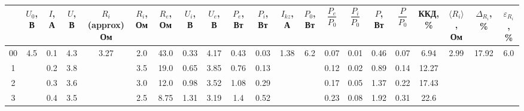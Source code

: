 \documentclass[a4paper,12pt]{article}
\begin{document}
\begin{table}[htp]
\begin{adjustwidth}{-2cm}{}
\begin{tabular}{|c|c|c|c|c|c|c|c|c|c|c|c|c|c|c|c|c|c|c|c|c|}
\hline
  & \makecell{$U_0$,\\  В} & \makecell{$I$, \\  А} & \makecell{$U$,\\  В} & \makecell{$R_i$ (approx)\\  Ом} & \makecell{$R_i$,\\  Ом} & \makecell{$R_e$,\\  Ом} & \makecell{$U_i$,\\  В} & \makecell{$U_e$,\\  В} & \makecell{$P_e$, \\  Вт} & \makecell{$P_i$, \\  Вт} & \makecell{$I_{kz}$,\\  А} &\makecell{ $P_0$, \\  Вт} & $\dfrac{P_e}{P_0}$ & $\dfrac{P_i}{P_0}$ & \makecell{$P$, \\  Вт} & $\dfrac{P}{P_0}$ & \makecell{ККД, \\  \%} & \makecell{$\langle R_i\rangle$, \\  Ом} & \makecell{$\Delta_{R_i}$, \\  \%} & \makecell{$\varepsilon_{R_i}$, \\  \%} \\ \hline00     & \multirow{8}{*}{4.5} & 0.1  & 4.3  & \multirow{8}{*}{3.27} & 2.0  & 43.0 & 0.33 & 4.17 & 0.43 & 0.03 & \multirow{8}{*}{1.38} & \multirow{8}{*}{6.2} & 0.07      & 0.01      & 0.46 & 0.07   & 6.94       & \multirow{8}{*}{2.99} & \multirow{8}{*}{17.92} & \multirow{8}{*}{6.0} \\ \cline{1-1} \cline{3-4} \cline{6-11} \cline{14-18}
1     &                      & 0.2  & 3.8  &                       & 3.5  & 19.0 & 0.65 & 3.85 & 0.76 & 0.13 &                       &                      & 0.12      & 0.02      & 0.89 & 0.14   & 12.27      &                       &                        &                      \\ \cline{1-1} \cline{3-4} \cline{6-11} \cline{14-18}
2     &                      & 0.3  & 3.6  &                       & 3.0  & 12.0 & 0.98 & 3.52 & 1.08 & 0.29 &                       &                      & 0.17      & 0.05      & 1.37 & 0.22   & 17.43      &                       &                        &                      \\ \cline{1-1} \cline{3-4} \cline{6-11} \cline{14-18}
3     &                      & 0.4  & 3.5  &                       & 2.5  & 8.75 & 1.31 & 3.19 & 1.4  & 0.52 &                       &                      & 0.23      & 0.08      & 1.92 & 0.31   & 22.6       &                       &                        &                      \\ \cline{1-1} \cline{3-4} \cline{6-11} \cline{14-18}

\end{tabular}
\end{adjustwidth}
\end{table}
\end{document}

